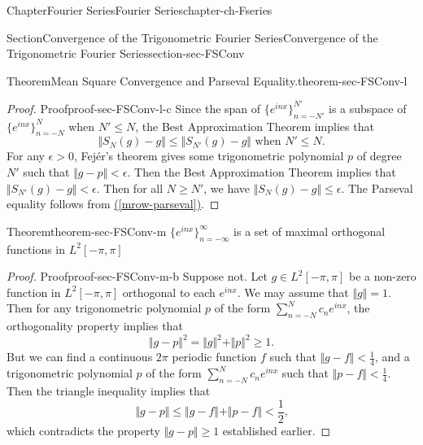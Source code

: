 \documentclass[oneside,10pt,]{book}
\newcommand{\xreffont}{\relax}
\numberwithin{equation}{section}
\newcommand{\lt}{<}
\newcommand{\gt}{>}
\begin{document}
\begin{chapterptx}{Chapter}{Fourier Series}{}{Fourier Series}{}{}{chapter-ch-Fseries}
\begin{sectionptx}{Section}{Convergence of the Trigonometric Fourier Series}{}{Convergence of the Trigonometric Fourier Series}{}{}{section-sec-FSConv}
\begin{theorem}{Theorem}{Mean Square Convergence and Parseval Equality.}{}{theorem-sec-FSConv-l}
\begin{equation*}
\end{equation*}
\end{theorem}
\begin{proof}{Proof}{}{proof-sec-FSConv-l-c}
Since the span of \(\{ e^{i nx}\}_{n=-N'}^{N'}\) is a subspace of \(\{ e^{i nx}\}_{n=-N}^{N}\) when \(N' \le N\), the Best Approximation Theorem implies that%
\begin{equation*}
\Vert S_{N}(g)-g\Vert\le \Vert S_{N'}(g)-g\Vert \text{ when $N' \le N$.}
\end{equation*}
For any \(\epsilon \gt 0\), Fejér's theorem gives some trigonometric polynomial \(p\) of degree \(N'\) such that \(\Vert g- p\Vert \lt \epsilon\). Then the Best Approximation Theorem implies that \(\Vert S_{N'}(g)-g\Vert \lt \epsilon\). Then for all \(N\ge N'\), we have \(\Vert S_{N}(g)-g\Vert\le \epsilon\). The Parseval equality follows from \hyperref[mrow-parseval]{({\xreffont\ref{mrow-parseval}})}.\end{proof}
\begin{theorem}{Theorem}{}{}{theorem-sec-FSConv-m}%
\(\{ e^{i nx}\}_{n=-\infty}^{\infty}\) is a set of maximal orthogonal functions	 in \(L^{2}[-\pi, \pi]\)\end{theorem}
\begin{proof}{Proof}{}{proof-sec-FSConv-m-b}
Suppose not. Let \(g\in L^{2}[-\pi, \pi]\) be a non-zero function in \(L^{2}[-\pi, \pi]\) orthogonal to each \(e^{i nx}\). We may assume that \(\Vert g \Vert =1\). Then for any trigonometric	 polynomial \(p\) of the form \(\sum_{n=-N}^{N}c_{n }e^{i nx}\), the orthogonality property implies that%
\begin{equation*}
\Vert g - p\Vert^{2}=\Vert g \Vert^{2}+ \Vert p\Vert^{2}\ge 1.
\end{equation*}
But we can find a continuous \(2\pi\) periodic function \(f\) such that \(\Vert g-f\Vert \lt \frac 14\), and a trigonometric	 polynomial \(p\) of the form \(\sum_{n=-N}^{N}c_{n }e^{i nx}\) such that  \(\Vert p-f\Vert \lt \frac 14\). Then the triangle inequality implies that%
\begin{equation*}
\Vert g-p\Vert \le \Vert g-f\Vert+ \Vert p-f\Vert \lt \frac 12\text{,}
\end{equation*}
which contradicts the property \(\Vert g - p\Vert\ge 1\) established earlier.\end{proof}
\end{sectionptx}
%
%
\typeout{************************************************}
\typeout{************************************************}

\end{chapterptx}
\end{document}
